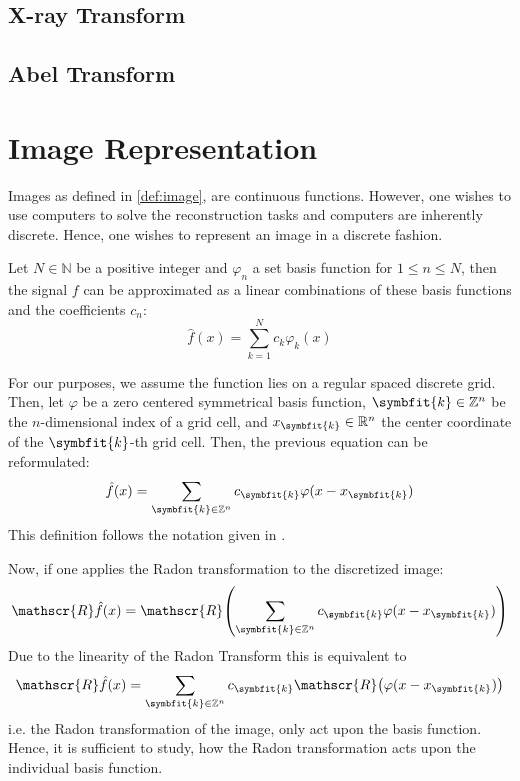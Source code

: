 
\section{X-ray Transform}

\section{Abel Transform}

\chapter{Image Representation}

Images as defined in \ref{def:image}, are continuous functions. However, one wishes to use computers
to solve the reconstruction tasks and computers are inherently discrete. Hence, one wishes to
represent an image in a discrete fashion.

\begin{definition}
	\label{def:permissible_representation}
	Let \(N \in \mathbb{N}\) be a positive integer and \(\varphi_n\) a set basis function for
	\(1 \leq n \leq N\), then the signal \(f\) can be approximated as a linear combinations
	of these basis functions and the coefficients \(c_n\):
	\[ \hat{f}(x) = \sum_{k=1}^{N} c_k \varphi_k(x) \]
\end{definition}

For our purposes, we assume the function lies on a regular spaced discrete grid. Then, let
\(\varphi\) be a zero centered symmetrical basis function, \(\symbfit{k} \in \mathbb{Z}^n\) be the
\(n\)-dimensional index of a grid cell, and \(x_{\symbfit{k}} \in \mathbb{R}^n\) the center coordinate
of the \(\symbfit{k}\)-th grid cell. Then, the previous equation can be reformulated:
\[ \hat{f}(x) = \sum_{\symbfit{k} \in \mathbb{Z}^n} c_{\symbfit{k}} \varphi(x - x_{\symbfit{k}}) \]
This definition follows the notation given in \cite{momey_new_2011}.


Now, if one applies the Radon transformation to the discretized image: 
\[ \mathscr{R}\hat{f}(x) = \mathscr{R}\left( \sum_{\symbfit{k} \in \mathbb{Z}^n} c_{\symbfit{k}} \varphi(x - x_{\symbfit{k}}) \right) \]
Due to the linearity of the Radon Transform this is equivalent to \[ \mathscr{R}\hat{f}(x) =  \sum_{\symbfit{k} \in \mathbb{Z}^n} c_{\symbfit{k}}\mathscr{R}\left( \varphi(x - x_{\symbfit{k}}) \right) \]
i.e. the Radon transformation of the image, only act upon the basis function. Hence, it is
sufficient to study, how the Radon transformation acts upon the individual basis function.

